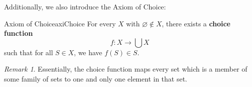 \documentclass[math]{amznotes}
\theoremstyle{remark}
\newtheorem*{remark}{Remark}
\begin{document}
Additionally, we also introduce the Axiom of Choice:
\begin{axibox}{Axiom of Choice}{axiChoice}
    For every $X$ with $\varnothing \notin X$, there exists a {\color{red} \textbf{choice function}}
    \begin{displaymath}
        f \colon X \to \bigcup X
    \end{displaymath}
    such that for all $S \in X$, we have $f(S) \in S$.
\end{axibox}
\begin{notebox}
    \begin{remark}
        Essentially, the choice function maps every set which is a member of some family of sets to one and only one element in that set.
    \end{remark}
\end{notebox}
\end{document}
